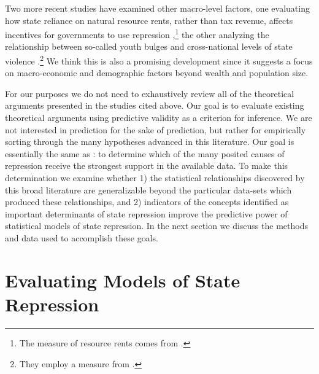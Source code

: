 \documentclass[12pt]{article}
\begin{document}
Two more recent studies have examined other macro-level factors, one evaluating how state reliance on natural resource rents, rather than tax revenue, affects incentives for governments to use repression \citep{DemerittYoung2013},\footnote{The measure of resource rents comes from \citet{Ross2006}.} the other analyzing the relationship between so-called youth bulges and cross-national levels of state violence \citep{NordasDavenport2013}.\footnote{They employ a measure from \citet{Urdal2006}.} We think this is also a promising development since it suggests a focus on macro-economic and demographic factors beyond wealth and population size. 

For our purposes we do not need to exhaustively review all of the theoretical arguments presented in the studies cited above. Our goal is to evaluate existing theoretical arguments using predictive validity as a criterion for inference. We are not interested in prediction for the sake of prediction, but rather for empirically sorting through the many hypotheses advanced in this literature. Our goal is essentially the same as \citet{PoeTate1994}: to determine which of the many posited causes of repression receive the strongest support in the available data. To make this determination we examine whether 1) the statistical relationships discovered by this broad literature are generalizable beyond the particular data-sets which produced these relationships, and 2) indicators of the concepts identified as important determinants of state repression improve the predictive power of statistical models of state repression. In the next section we discuss the methods and data used to accomplish these goals.

\section{Evaluating Models of State Repression}
 
\end{document}
